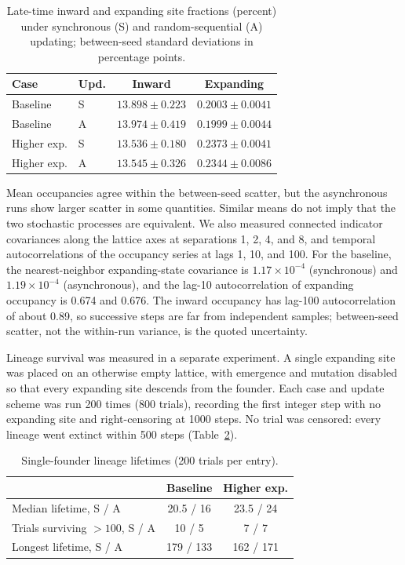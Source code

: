 \documentclass[10pt,twocolumn]{article}
\begin{document}
\begin{table}[ht]
\centering
\caption{Late-time inward and expanding site fractions (percent) under
synchronous (S) and random-sequential (A) updating; between-seed
standard deviations in percentage points.}
\setlength{\tabcolsep}{4pt}
\begin{tabular}{llcc}
\toprule
Case & Upd. & Inward & Expanding\\
\midrule
Baseline & S & $13.898\pm0.223$ & $0.2003\pm0.0041$\\
Baseline & A & $13.974\pm0.419$ & $0.1999\pm0.0044$\\
Higher exp. & S & $13.536\pm0.180$ & $0.2373\pm0.0041$\\
Higher exp. & A & $13.545\pm0.326$ & $0.2344\pm0.0086$\\
\bottomrule
\end{tabular}
\label{tab:async}
\end{table}

Mean occupancies agree within the between-seed scatter, but the
asynchronous runs show larger scatter in some quantities. Similar means
do not imply that the two stochastic processes are equivalent.
We also measured connected indicator covariances along the lattice axes
at separations 1, 2, 4, and 8, and temporal autocorrelations of the
occupancy series at lags 1, 10, and 100. For the baseline, the
nearest-neighbor expanding-state covariance is $1.17\times10^{-4}$
(synchronous) and $1.19\times10^{-4}$ (asynchronous), and the
lag-10 autocorrelation of expanding occupancy is 0.674 and 0.676.
The inward occupancy has lag-100 autocorrelation of about 0.89, so
successive steps are far from independent samples; between-seed
scatter, not the within-run variance, is the quoted uncertainty.

Lineage survival was measured in a separate experiment. A single
expanding site was placed on an otherwise empty lattice, with
emergence and mutation disabled so that every expanding site descends
from the founder. Each case and update scheme was run 200 times
(800 trials), recording the first integer step with no expanding site
and right-censoring at 1000 steps. No trial was censored: every lineage
went extinct within 500 steps (Table~\ref{tab:lineage}).

\begin{table}[ht]
\centering
\caption{Single-founder lineage lifetimes (200 trials per entry).}
\setlength{\tabcolsep}{4pt}
\begin{tabular}{lcc}
\toprule
& Baseline & Higher exp.\\
\midrule
Median lifetime, S / A & 20.5 / 16 & 23.5 / 24\\
Trials surviving $>100$, S / A & 10 / 5 & 7 / 7\\
Longest lifetime, S / A & 179 / 133 & 162 / 171\\
\bottomrule
\end{tabular}
\label{tab:lineage}
\end{table}
\end{document}
